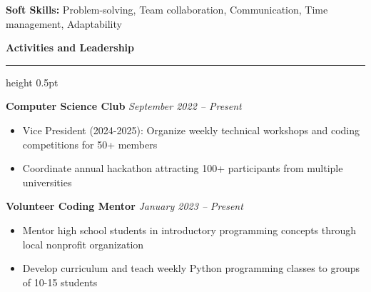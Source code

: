 \documentclass[11pt,letterpaper]{article}
\newcommand{\resumesection}[1]{
    \vspace{0.5em}
    {\color{accentcolor}\textbf{\large #1}}
    \vspace{0.15em}
    {\color{accentcolor}\hrule height 0.5pt}
    \vspace{0.3em}
}
\begin{document}
\textbf{Soft Skills:} Problem-solving, Team collaboration, Communication, Time management, Adaptability

\vspace{0.3em}

\resumesection{Activities and Leadership}

\textbf{Computer Science Club} \hfill \textit{September 2022 -- Present}
\begin{itemize}
    \item Vice President (2024-2025): Organize weekly technical workshops and coding competitions for 50+ members
    \item Coordinate annual hackathon attracting 100+ participants from multiple universities
\end{itemize}

\vspace{0.2em}

\textbf{Volunteer Coding Mentor} \hfill \textit{January 2023 -- Present}
\begin{itemize}
    \item Mentor high school students in introductory programming concepts through local nonprofit organization
    \item Develop curriculum and teach weekly Python programming classes to groups of 10-15 students
\end{itemize}
\end{document}
